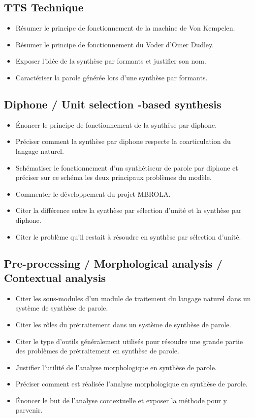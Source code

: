 \documentclass[letterpaper, 12pt]{article}
\begin{document}
	\subsection{TTS Technique}
		\begin{itemize}
			\setlength{\itemsep}{0pt}		
			\setlength{\parskip}{0pt}		
			\setlength{\parsep}{0pt}	
			\item  Résumer le principe de fonctionnement de la machine de Von Kempelen.
		    \item Résumer le principe de fonctionnement du Voder d'Omer Dudley.
		    \item Exposer l'idée de la synthèse par formants et justifier son nom.
		    \item Caractériser la parole générée lors d'une synthèse par formants.
		\end{itemize}
	\subsection{Diphone / Unit selection -based synthesis}
		\begin{itemize}
			\setlength{\itemsep}{0pt}		
			\setlength{\parskip}{0pt}		
			\setlength{\parsep}{0pt}	
			\item Énoncer le principe de fonctionnement de la synthèse par diphone.
		    \item Préciser comment la synthèse par diphone respecte la coarticulation du langage naturel.
		    \item Schématiser le fonctionnement d'un synthétiseur de parole par diphone et préciser sur 
		    	ce schéma les deux principaux problèmes du modèle.
		    \item Commenter le développement du projet MBROLA.
		    \item Citer la différence entre la synthèse par sélection d'unité et la synthèse par diphone.
		    \item Citer le problème qu'il restait à résoudre en synthèse par sélection d'unité.
		\end{itemize}
	\subsection{Pre-processing / Morphological analysis / Contextual analysis}
		\begin{itemize}
			\setlength{\itemsep}{0pt}		
			\setlength{\parskip}{0pt}		
			\setlength{\parsep}{0pt}	
			\item Citer les sous-modules d'un module de traitement du langage naturel dans un système de 
				synthèse de parole.
		    \item Citer les rôles du prétraitement dans un système de synthèse de parole.
		    \item Citer le type d'outils généralement utilisés pour résoudre une grande partie des 
		    	problèmes de prétraitement en synthèse de parole.
		    \item Justifier l'utilité de l'analyse morphologique en synthèse de parole.
		    \item Préciser comment est réalisée l'analyse morphologique en synthèse de parole.
		    \item Énoncer le but de l'analyse contextuelle et exposer la méthode pour y parvenir.
		\end{itemize}
\end{document}
